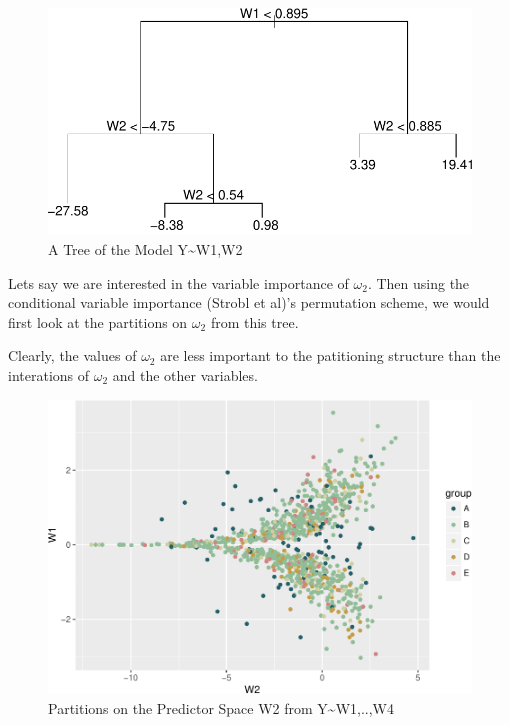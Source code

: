 \documentclass[12pt,twoside]{reedthesis}
\begin{document}
  \begin{figure}[htbp]
  \centering
  \includegraphics{Thesis_files/figure-latex/t1ch4-1.pdf}
  \caption{\label{fig:t1ch4}A Tree of the Model Y\textasciitilde{}W1,W2}
  \end{figure}
  
  Lets say we are interested in the variable importance of \(\omega_2\).
  Then using the conditional variable importance (Strobl et al)'s
  permutation scheme, we would first look at the partitions on
  \(\omega_2\) from this tree.
  
  Clearly, the values of \(\omega_2\) are less important to the
  patitioning structure than the interations of \(\omega_2\) and the other
  variables.
  
  \begin{figure}[htbp]
  \centering
  \includegraphics{Thesis_files/figure-latex/p3ch4-1.pdf}
  \caption{\label{fig:p3ch4}Partitions on the Predictor Space W2 from
  Y\textasciitilde{}W1,..,W4}
  \end{figure}
  
\end{document}
